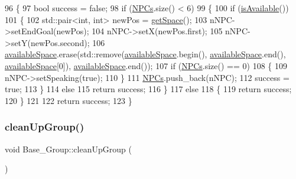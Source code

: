 \begin{DoxyCode}
96 \{
97     \textcolor{keywordtype}{bool} success = \textcolor{keyword}{false};
98     \textcolor{keywordflow}{if} (\hyperlink{class_base___group_a4757f3c06c73eea029f71b871c1d863e}{NPCs}.size() < 6)
99     \{
100         \textcolor{keywordflow}{if} (\hyperlink{class_base___group_a6d806401632aa9f7795984bb2b4880f0}{isAvailable}())
101         \{
102             std::pair<int, int> newPos = \hyperlink{class_base___group_a4f6559c7a35e04e6355454df2e3be3b2}{getSpace}();
103             nNPC->setEndGoal(newPos);
104             nNPC->setX(newPos.first);
105             nNPC->setY(newPos.second);
106             \hyperlink{class_base___group_a8eb46d3107d53da0f5fbea2410b4b095}{availableSpace}.erase(std::remove(\hyperlink{class_base___group_a8eb46d3107d53da0f5fbea2410b4b095}{availableSpace}.begin(), 
      \hyperlink{class_base___group_a8eb46d3107d53da0f5fbea2410b4b095}{availableSpace}.end(), \hyperlink{class_base___group_a8eb46d3107d53da0f5fbea2410b4b095}{availableSpace}[0]), 
      \hyperlink{class_base___group_a8eb46d3107d53da0f5fbea2410b4b095}{availableSpace}.end());
107             \textcolor{keywordflow}{if} (\hyperlink{class_base___group_a4757f3c06c73eea029f71b871c1d863e}{NPCs}.size() == 0)
108             \{
109                 nNPC->setSpeaking(\textcolor{keyword}{true});
110             \}
111             \hyperlink{class_base___group_a4757f3c06c73eea029f71b871c1d863e}{NPCs}.push\_back(nNPC);
112             success = \textcolor{keyword}{true};
113         \}
114         \textcolor{keywordflow}{else}
115             \textcolor{keywordflow}{return} success;
116     \}
117     \textcolor{keywordflow}{else}
118     \{
119         \textcolor{keywordflow}{return} success;
120     \}
121 
122     \textcolor{keywordflow}{return} success;
123 \}
\end{DoxyCode}
\mbox{\label{class_base___group_adebda6363b9f9097a8c866398e20f3c3}} 
\subsubsection{\texorpdfstring{clean\+Up\+Group()}{cleanUpGroup()}}
{\footnotesize\ttfamily void Base\+\_\+\+Group\+::clean\+Up\+Group (\begin{DoxyParamCaption}{ }\end{DoxyParamCaption})}



